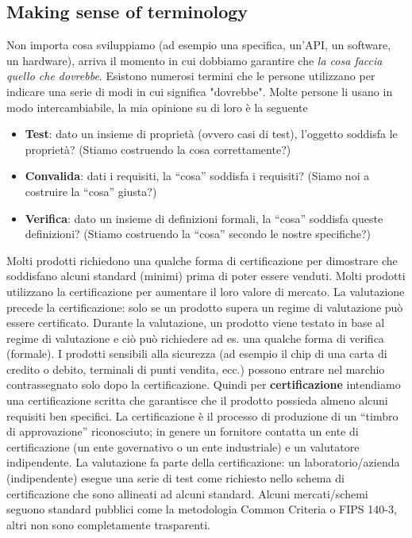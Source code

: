 \documentclass[11pt]{article}
\theoremstyle{definition} \newtheorem{definizione}{Definizione}[section] %
\begin{document}
    \subsection{Making sense of terminology}
    Non importa cosa sviluppiamo (ad esempio una specifica, un'API, un software, un hardware), arriva il momento in cui dobbiamo garantire che \textit{la cosa faccia quello che dovrebbe}.
    Esistono numerosi termini che le persone utilizzano per indicare una serie di modi in cui significa "dovrebbe". Molte persone li usano in modo intercambiabile, la mia opinione su di loro è la seguente
    \begin{itemize}
        \item \textbf{Test}: dato un insieme di proprietà (ovvero casi di test), l'oggetto soddisfa le proprietà? (Stiamo costruendo la cosa correttamente?)
        \item \textbf{Convalida}: dati i requisiti, la “cosa” soddisfa i requisiti? (Siamo noi a costruire la “cosa” giusta?)
        \item \textbf{Verifica}: dato un insieme di definizioni formali, la “cosa” soddisfa queste definizioni? (Stiamo costruendo la “cosa” secondo le nostre specifiche?)
    \end{itemize}

    Molti prodotti richiedono una qualche forma di certificazione per dimostrare che soddisfano alcuni standard (minimi) prima di poter essere venduti.
    Molti prodotti utilizzano la certificazione per aumentare il loro valore di mercato.
    La valutazione precede la certificazione: solo se un prodotto supera un regime di valutazione può essere certificato. Durante la valutazione, un prodotto viene testato in base al regime di valutazione e ciò può richiedere ad es. una qualche forma di verifica (formale).
    I prodotti sensibili alla sicurezza (ad esempio il chip di una carta di credito o debito, terminali di punti vendita, ecc.) possono entrare nel marchio contrassegnato solo dopo la certificazione. Quindi per \textbf{certificazione} intendiamo una certificazione scritta che garantisce che il prodotto possieda almeno alcuni requisiti ben specifici.
    La certificazione è il processo di produzione di un “timbro di approvazione” riconosciuto; in genere un fornitore contatta un ente di certificazione (un ente governativo o un ente industriale) e un valutatore indipendente.
    La valutazione fa parte della certificazione: un laboratorio/azienda (indipendente) esegue una serie di test come richiesto nello schema di certificazione che sono allineati ad alcuni standard.
    Alcuni mercati/schemi seguono standard pubblici come la metodologia Common Criteria o FIPS 140-3, altri non sono completamente trasparenti.
\end{document}
